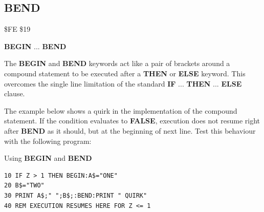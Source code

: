 
\newpage
\subsection{BEND}
\begin{description}[leftmargin=2cm,style=nextline]
\item [Token:] \$FE \$19
\item [Format:] {\bf BEGIN} ... {\bf BEND}
\item [Usage:] The {\bf BEGIN} and {\bf BEND} keywords act like
               a pair of brackets around a compound statement
               to be executed after a {\bf THEN} or {\bf ELSE} keyword.
               This overcomes the single line limitation of the
               standard {\bf IF} ... {\bf THEN} ... {\bf ELSE} clause.
\item [Remarks:] The example below shows a quirk in the implementation
                 of the compound statement.
                 If the condition evaluates to {\bf FALSE}, execution
                 does not resume right after {\bf BEND} as it should,
                 but at the beginning of next line.
                 Test this behaviour with the following program:
\item [Example:] Using {\bf BEGIN} and {\bf BEND}
\begin{tcolorbox}[colback=black,coltext=white]
\verbatimfont{\codefont}
\begin{verbatim}
10 IF Z > 1 THEN BEGIN:A$="ONE"
20 B$="TWO"
30 PRINT A$;" ";B$;:BEND:PRINT " QUIRK"
40 REM EXECUTION RESUMES HERE FOR Z <= 1
\end{verbatim}
\end{tcolorbox}
\end{description}


\newpage
